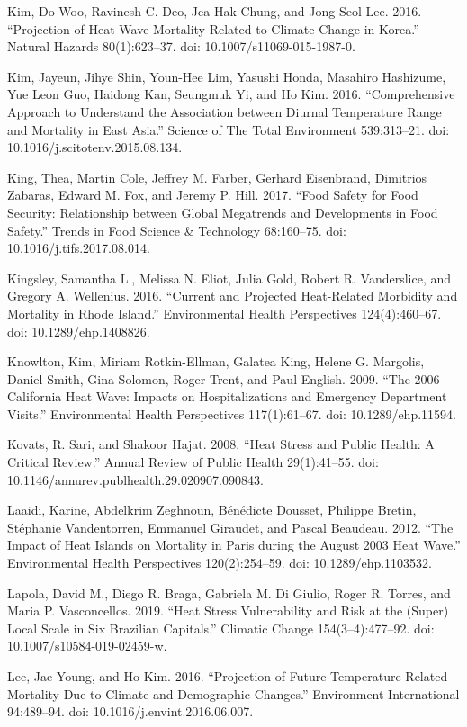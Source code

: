 \documentclass[12pt]{article}
\begin{document}
Kim, Do-Woo, Ravinesh C. Deo, Jea-Hak Chung, and Jong-Seol Lee. 2016.
``Projection of Heat Wave Mortality Related to Climate Change in
Korea.'' Natural Hazards 80(1):623--37. doi: 10.1007/s11069-015-1987-0.

Kim, Jayeun, Jihye Shin, Youn-Hee Lim, Yasushi Honda, Masahiro
Hashizume, Yue Leon Guo, Haidong Kan, Seungmuk Yi, and Ho Kim. 2016.
``Comprehensive Approach to Understand the Association between Diurnal
Temperature Range and Mortality in East Asia.'' Science of The Total
Environment 539:313--21. doi: 10.1016/j.scitotenv.2015.08.134.

King, Thea, Martin Cole, Jeffrey M. Farber, Gerhard Eisenbrand,
Dimitrios Zabaras, Edward M. Fox, and Jeremy P. Hill. 2017. ``Food
Safety for Food Security: Relationship between Global Megatrends and
Developments in Food Safety.'' Trends in Food Science \& Technology
68:160--75. doi: 10.1016/j.tifs.2017.08.014.

Kingsley, Samantha L., Melissa N. Eliot, Julia Gold, Robert R.
Vanderslice, and Gregory A. Wellenius. 2016. ``Current and Projected
Heat-Related Morbidity and Mortality in Rhode Island.'' Environmental
Health Perspectives 124(4):460--67. doi: 10.1289/ehp.1408826.

Knowlton, Kim, Miriam Rotkin-Ellman, Galatea King, Helene G. Margolis,
Daniel Smith, Gina Solomon, Roger Trent, and Paul English. 2009. ``The
2006 California Heat Wave: Impacts on Hospitalizations and Emergency
Department Visits.'' Environmental Health Perspectives 117(1):61--67.
doi: 10.1289/ehp.11594.

Kovats, R. Sari, and Shakoor Hajat. 2008. ``Heat Stress and Public
Health: A Critical Review.'' Annual Review of Public Health
29(1):41--55. doi: 10.1146/annurev.publhealth.29.020907.090843.

Laaidi, Karine, Abdelkrim Zeghnoun, Bénédicte Dousset, Philippe Bretin,
Stéphanie Vandentorren, Emmanuel Giraudet, and Pascal Beaudeau. 2012.
``The Impact of Heat Islands on Mortality in Paris during the August
2003 Heat Wave.'' Environmental Health Perspectives 120(2):254--59. doi:
10.1289/ehp.1103532.

Lapola, David M., Diego R. Braga, Gabriela M. Di Giulio, Roger R.
Torres, and Maria P. Vasconcellos. 2019. ``Heat Stress Vulnerability and
Risk at the (Super) Local Scale in Six Brazilian Capitals.'' Climatic
Change 154(3--4):477--92. doi: 10.1007/s10584-019-02459-w.

Lee, Jae Young, and Ho Kim. 2016. ``Projection of Future
Temperature-Related Mortality Due to Climate and Demographic Changes.''
Environment International 94:489--94. doi: 10.1016/j.envint.2016.06.007.
\end{document}
